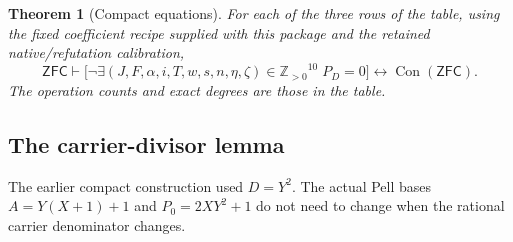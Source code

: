 \documentclass[11pt,letterpaper]{article}
\newtheorem{theorem}{Theorem}[section]
\theoremstyle{definition}\newtheorem{definition}[theorem]{Definition}
\theoremstyle{remark}\newtheorem{remark}[theorem]{Remark}
\newcommand{\Pos}{\ensuremath{\mathbb Z_{>0}}}
\newcommand{\Con}{\operatorname{Con}}
\newcommand{\ZFC}{\ensuremath{\mathsf{ZFC}}}
\begin{document}
\begin{theorem}[Compact equations]\label{thm:compact}
For each of the three rows of the table, using the fixed coefficient recipe supplied with this package and the retained native/refutation calibration,
\[
 \ZFC\vdash
 \bigl[\neg\exists(J,F,\alpha,i,T,w,s,n,\eta,\zeta)\in\Pos^{10}
       \;P_D=0\bigr]\longleftrightarrow\Con(\ZFC).
\]
The operation counts and exact degrees are those in the table.
\end{theorem}

\subsection{The carrier-divisor lemma}
The earlier compact construction used \(D=Y^2\). The actual Pell bases \(A=Y(X+1)+1\) and \(P_0=2XY^2+1\) do not need to change when the rational carrier denominator changes.
\end{document}
